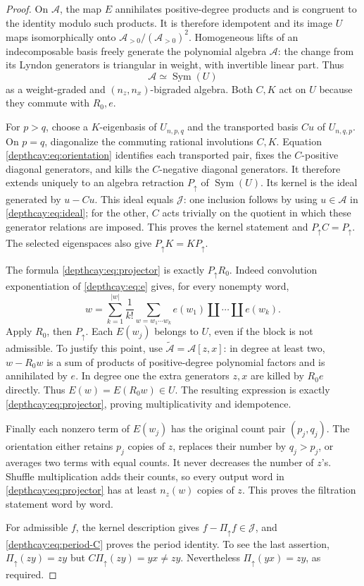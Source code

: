 \documentclass[11pt,a4paper]{article}
\numberwithin{equation}{section}
\theoremstyle{definition}
\theoremstyle{remark}
\newcommand{\shuffle}{\mathbin{\amalg}}
\begin{document}
\begin{proof}
On $\mathcal A$, the map $E$ annihilates positive-degree products and
is congruent to the identity modulo such products. It is therefore
idempotent and its image $U$ maps isomorphically onto
$\mathcal A_{>0}/(\mathcal A_{>0})^2$. Homogeneous lifts of an
indecomposable basis freely generate the polynomial algebra
$\mathcal A$: the change from its Lyndon generators is triangular in
weight, with invertible linear part. Thus
\begin{equation}\label{depthcay:eq:SymU}
 \mathcal A\simeq\operatorname{Sym}(U)
\end{equation}
as a weight-graded and $(n_z,n_x)$-bigraded algebra. Both $C,K$ act
on $U$ because they commute with $R_0,e$.

For $p>q$, choose a $K$-eigenbasis of $U_{n,p,q}$ and the transported
basis $Cu$ of $U_{n,q,p}$. On $p=q$, diagonalize the commuting rational
involutions $C,K$. Equation \eqref{depthcay:eq:orientation} identifies
each transported pair, fixes the $C$-positive diagonal generators,
and kills the $C$-negative diagonal generators. It therefore extends
uniquely to an algebra retraction $P_{\uparrow}$ of
$\operatorname{Sym}(U)$. Its kernel is the ideal generated by
$u-Cu$. This ideal equals $\mathcal J$: one inclusion follows by
using $u\in\mathcal A$ in \eqref{depthcay:eq:ideal}; for the other,
$C$ acts trivially on the quotient in which these generator relations
are imposed. This proves the kernel statement and
$P_{\uparrow}C=P_{\uparrow}$. The selected eigenspaces also give
$P_{\uparrow}K=KP_{\uparrow}$.

The formula \eqref{depthcay:eq:projector} is exactly
$P_{\uparrow}R_0$. Indeed convolution exponentiation of
\eqref{depthcay:eq:e} gives, for every nonempty word,
\[
 w=\sum_{k=1}^{|w|}\frac1{k!}
 \sum_{w=w_1\cdots w_k}e(w_1)\shuffle\cdots\shuffle e(w_k).
\]
Apply $R_0$, then $P_{\uparrow}$. Each $E(w_j)$ belongs to $U$,
even if the block is not admissible. To justify this point, use
$\widetilde{\mathcal A}=\mathcal A[z,x]$: in degree at least two,
$w-R_0w$ is a sum of products of positive-degree polynomial factors
and is annihilated by $e$. In degree one the extra generators $z,x$
are killed by $R_0e$ directly. Thus $E(w)=E(R_0w)\in U$.
The resulting expression is exactly \eqref{depthcay:eq:projector},
proving multiplicativity and idempotence.

Finally each nonzero term of $E(w_j)$ has the original count pair
$(p_j,q_j)$. The orientation either retains $p_j$ copies of $z$,
replaces their number by $q_j>p_j$, or averages two terms with equal
counts. It never decreases the number of $z$'s. Shuffle multiplication
adds their counts, so every output word in
\eqref{depthcay:eq:projector} has at least $n_z(w)$ copies of $z$.
This proves the filtration statement word by word.

For admissible $f$, the kernel description gives
$f-\Pi_{\uparrow}f\in\mathcal J$, and
\eqref{depthcay:eq:period-C} proves the period identity.
To see the last assertion, $\Pi_{\uparrow}(zy)=zy$ but
$C\Pi_{\uparrow}(zy)=yx\ne zy$. Nevertheless
$\Pi_{\uparrow}(yx)=zy$, as required.
\end{proof}
\end{document}
